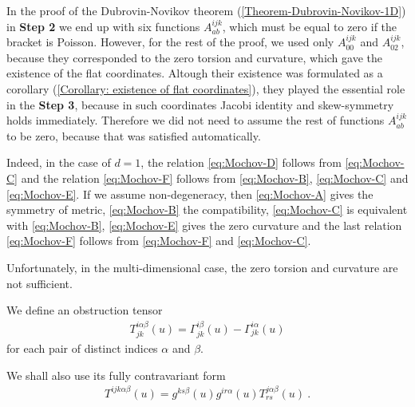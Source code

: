 \begin{remark}
    In the proof of the Dubrovin-Novikov theorem (\vref{Theorem-Dubrovin-Novikov-1D}) in \textbf{Step 2} we end up with six functions $A^{ijk}_{ab}$, which must be equal to zero if the bracket is Poisson. However, for the rest of the proof, we used only $A^{ijk}_{00}$ and $A^{ijk}_{02}$, because they corresponded to the zero torsion and curvature, which gave the existence of the flat coordinates. Altough their existence was formulated as a corollary (\vref{Corollary: existence of flat coordinates}), they played the essential role in the \textbf{Step 3}, because in such coordinates Jacobi identity and skew-symmetry holds immediately. Therefore we did not need to assume the rest of functions $A^{ijk}_{ab}$ to be zero, because that was satisfied automatically.

    Indeed, in the case of $d = 1$, the relation \eqref{eq:Mochov-D} follows from \eqref{eq:Mochov-C} and the relation \eqref{eq:Mochov-F} follows from \eqref{eq:Mochov-B}, \eqref{eq:Mochov-C} and \eqref{eq:Mochov-E}. If we assume non-degeneracy, then \eqref{eq:Mochov-A} gives the symmetry of metric, \eqref{eq:Mochov-B} the compatibility, \eqref{eq:Mochov-C} is equivalent with \eqref{eq:Mochov-B}, \eqref{eq:Mochov-E} gives the zero curvature and the last relation \eqref{eq:Mochov-F} follows from \eqref{eq:Mochov-F} and \eqref{eq:Mochov-C}.

    Unfortunately, in the multi-dimensional case, the zero torsion and curvature are not sufficient.
\end{remark}

\begin{definition}
    We define an obstruction tensor
    \begin{align}
        T^{i \alpha \beta}_{jk} (u) = \Gamma^{i \beta}_{jk}(u) - \Gamma^{i \alpha}_{jk}(u)
    \end{align}
    for each pair of distinct indices $\alpha$ and $\beta$.
\end{definition}
We shall also use its fully contravariant form
\begin{align}
    T^{ijk \alpha \beta}(u) = g^{ks \beta}(u) g^{i r \alpha}(u) T^{j \alpha \beta}_{rs} (u) \:.
\end{align}


